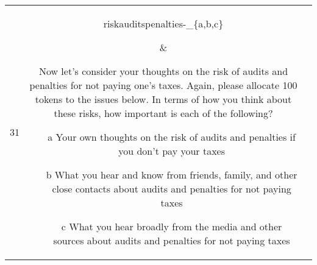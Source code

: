 \begin{table}[!h]
{\begin{tabular}{|c|c|c|}
31&   \parbox[c][0.05\textheight][c]{0.17\textwidth} { riskauditspenalties-\_\{a,b,c\} } & \parbox[c][0.22\textheight][c]{0.68\textwidth} {Now let's consider your thoughts on the risk of audits and penalties for not paying one's taxes.  Again, please allocate 100 tokens to the issues below.  
In terms of how you think about these risks, how important is each of the following?
\begin{itemize}%
\item[a] Your own thoughts on the risk of audits and penalties if you don't pay your taxes
\item[b] What you hear and know from friends, family, and other close contacts about audits and penalties for not paying taxes 
\item[c] What you hear broadly from the media and other sources about audits and penalties for not paying taxes 
\end{itemize}
}
\\  \hline


\end{tabular}
}
\end{table}
